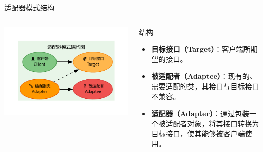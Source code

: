 \documentclass[UTF8,aspectratio=169]{beamer}
\begin{document}
\begin{frame}{适配器模式结构}
    \begin{columns}
        \begin{column}{0.38\textwidth}
            \includegraphics[width=1.0\textwidth]{images/adapter_pattern.pdf}
        \end{column}
        \begin{column}{0.58\textwidth}
            \begin{ytublock}{结构}
                \begin{itemize}
                    \item \textbf{目标接口（Target）}：客户端所期望的接口。
                    \item \textbf{被适配者（Adaptee）}：现有的、需要适配的类，其接口与目标接口不兼容。
                    \item \textbf{适配器（Adapter）}：通过包装一个被适配者对象，将其接口转换为目标接口，使其能够被客户端使用。
                \end{itemize}
            \end{ytublock}
        \end{column}
    \end{columns}
\end{frame}
\end{document}
